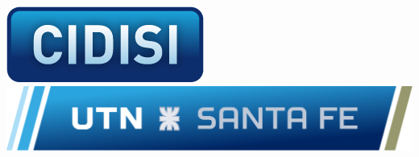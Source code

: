 {\begin{center}
\begin{columns}
\begin{column}{30mm}
	\begin{center}
		\includegraphics[scale=0.10]{logos/logo_cidisi.png}\\[3pt]
		\includegraphics[scale=0.15]{logos/logo_UTN_vect.pdf}
	\end{center}
	\end{column}	
	\end{columns}
		  	\vspace{-1cm}
\end{center}
}